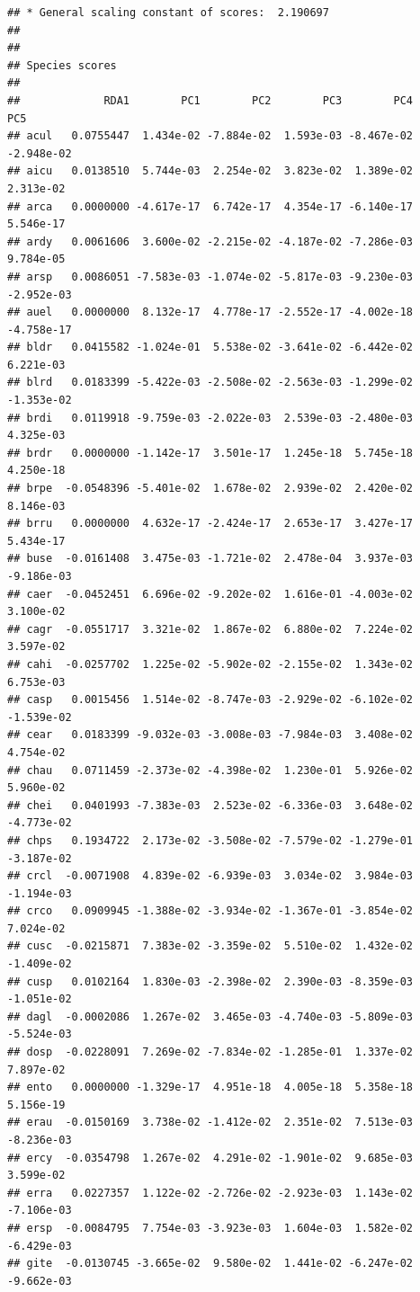 \documentclass[
]{article}
\begin{document}
\begin{verbatim}
## * General scaling constant of scores:  2.190697 
## 
## 
## Species scores
## 
##             RDA1        PC1        PC2        PC3        PC4        PC5
## acul   0.0755447  1.434e-02 -7.884e-02  1.593e-03 -8.467e-02 -2.948e-02
## aicu   0.0138510  5.744e-03  2.254e-02  3.823e-02  1.389e-02  2.313e-02
## arca   0.0000000 -4.617e-17  6.742e-17  4.354e-17 -6.140e-17  5.546e-17
## ardy   0.0061606  3.600e-02 -2.215e-02 -4.187e-02 -7.286e-03  9.784e-05
## arsp   0.0086051 -7.583e-03 -1.074e-02 -5.817e-03 -9.230e-03 -2.952e-03
## auel   0.0000000  8.132e-17  4.778e-17 -2.552e-17 -4.002e-18 -4.758e-17
## bldr   0.0415582 -1.024e-01  5.538e-02 -3.641e-02 -6.442e-02  6.221e-03
## blrd   0.0183399 -5.422e-03 -2.508e-02 -2.563e-03 -1.299e-02 -1.353e-02
## brdi   0.0119918 -9.759e-03 -2.022e-03  2.539e-03 -2.480e-03  4.325e-03
## brdr   0.0000000 -1.142e-17  3.501e-17  1.245e-18  5.745e-18  4.250e-18
## brpe  -0.0548396 -5.401e-02  1.678e-02  2.939e-02  2.420e-02  8.146e-03
## brru   0.0000000  4.632e-17 -2.424e-17  2.653e-17  3.427e-17  5.434e-17
## buse  -0.0161408  3.475e-03 -1.721e-02  2.478e-04  3.937e-03 -9.186e-03
## caer  -0.0452451  6.696e-02 -9.202e-02  1.616e-01 -4.003e-02  3.100e-02
## cagr  -0.0551717  3.321e-02  1.867e-02  6.880e-02  7.224e-02  3.597e-02
## cahi  -0.0257702  1.225e-02 -5.902e-02 -2.155e-02  1.343e-02  6.753e-03
## casp   0.0015456  1.514e-02 -8.747e-03 -2.929e-02 -6.102e-02 -1.539e-02
## cear   0.0183399 -9.032e-03 -3.008e-03 -7.984e-03  3.408e-02  4.754e-02
## chau   0.0711459 -2.373e-02 -4.398e-02  1.230e-01  5.926e-02  5.960e-02
## chei   0.0401993 -7.383e-03  2.523e-02 -6.336e-03  3.648e-02 -4.773e-02
## chps   0.1934722  2.173e-02 -3.508e-02 -7.579e-02 -1.279e-01 -3.187e-02
## crcl  -0.0071908  4.839e-02 -6.939e-03  3.034e-02  3.984e-03 -1.194e-03
## crco   0.0909945 -1.388e-02 -3.934e-02 -1.367e-01 -3.854e-02  7.024e-02
## cusc  -0.0215871  7.383e-02 -3.359e-02  5.510e-02  1.432e-02 -1.409e-02
## cusp   0.0102164  1.830e-03 -2.398e-02  2.390e-03 -8.359e-03 -1.051e-02
## dagl  -0.0002086  1.267e-02  3.465e-03 -4.740e-03 -5.809e-03 -5.524e-03
## dosp  -0.0228091  7.269e-02 -7.834e-02 -1.285e-01  1.337e-02  7.897e-02
## ento   0.0000000 -1.329e-17  4.951e-18  4.005e-18  5.358e-18  5.156e-19
## erau  -0.0150169  3.738e-02 -1.412e-02  2.351e-02  7.513e-03 -8.236e-03
## ercy  -0.0354798  1.267e-02  4.291e-02 -1.901e-02  9.685e-03  3.599e-02
## erra   0.0227357  1.122e-02 -2.726e-02 -2.923e-03  1.143e-02 -7.106e-03
## ersp  -0.0084795  7.754e-03 -3.923e-03  1.604e-03  1.582e-02 -6.429e-03
## gite  -0.0130745 -3.665e-02  9.580e-02  1.441e-02 -6.247e-02 -9.662e-03

\end{verbatim}
\end{document}
